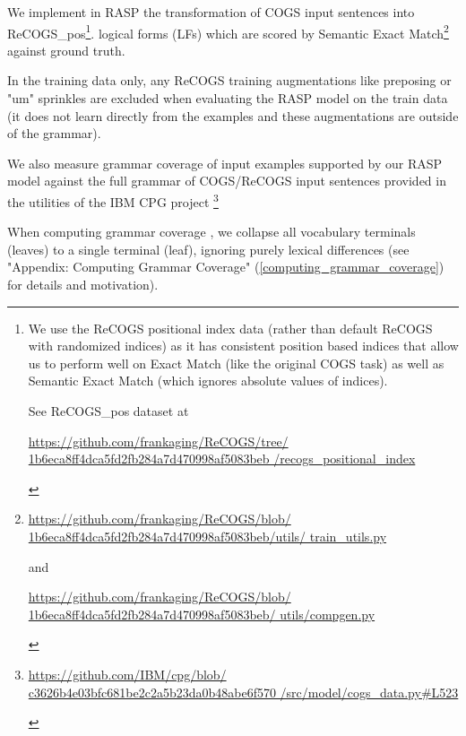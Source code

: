 \documentclass[11pt]{article}
\begin{document}
We implement in RASP the transformation of COGS input sentences into ReCOGS\_pos\footnote{
\begin{footnotesize}We use the ReCOGS positional index data (rather than default ReCOGS with randomized indices) as it has consistent position based indices that allow us to perform well on Exact Match (like the original COGS task) as well as Semantic Exact Match (which ignores absolute values of indices).

See ReCOGS\_pos dataset at 

\href{https://github.com/frankaging/ReCOGS/tree/1b6eca8ff4dca5fd2fb284a7d470998af5083beb/recogs\_positional\_index}{https://github.com/frankaging/ReCOGS/tree/
1b6eca8ff4dca5fd2fb284a7d470998af5083beb
/recogs\_positional\_index}\end{footnotesize}
}. logical forms (LFs) which are scored by Semantic Exact Match\footnote{ 
\begin{footnotesize}\href{https://github.com/frankaging/ReCOGS/blob/1b6eca8ff4dca5fd2fb284a7d470998af5083beb/utils/train_utils.py}{https://github.com/frankaging/ReCOGS/blob/
1b6eca8ff4dca5fd2fb284a7d470998af5083beb/utils/
train\_utils.py}

and

\href{https://github.com/frankaging/ReCOGS/blob/1b6eca8ff4dca5fd2fb284a7d470998af5083beb/utils/compgen.py}{https://github.com/frankaging/ReCOGS/blob/
1b6eca8ff4dca5fd2fb284a7d470998af5083beb/
utils/compgen.py}
\end{footnotesize}
} against ground truth.

In the training data only, any ReCOGS training augmentations like preposing or "um" sprinkles are excluded when evaluating the RASP model on the train data (it does not learn directly from the examples and these augmentations are outside of the grammar). 

We also measure grammar coverage of input examples supported by our RASP model against the full grammar of COGS/ReCOGS input sentences provided in the utilities of the IBM CPG project \cite{klinger2024compositionalprogramgenerationfewshot}\footnote{\begin{footnotesize}\href{https://github.com/IBM/cpg/blob/c3626b4e03bfc681be2c2a5b23da0b48abe6f570/src/model/cogs_data.py\#L523}{https://github.com/IBM/cpg/blob/
c3626b4e03bfc681be2c2a5b23da0b48abe6f570
/src/model/cogs\_data.py\#L523}
\end{footnotesize}
}

When computing grammar coverage \cite{fuzzingbook2023:GrammarCoverageFuzzer}, we collapse all vocabulary terminals (leaves) to a single terminal (leaf), ignoring purely lexical differences (see "Appendix: Computing Grammar Coverage" (\ref{computing_grammar_coverage}) for details and motivation).
\end{document}
